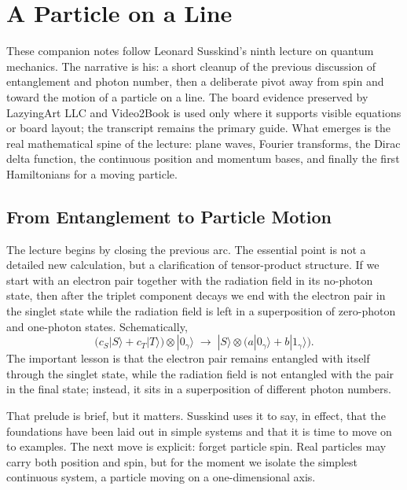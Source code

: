 \chapter{A Particle on a Line}

These companion notes follow Leonard Susskind's ninth lecture on quantum mechanics. The narrative is his: a short cleanup of the previous discussion of entanglement and photon number, then a deliberate pivot away from spin and toward the motion of a particle on a line. The board evidence preserved by LazyingArt LLC and Video2Book is used only where it supports visible equations or board layout; the transcript remains the primary guide. What emerges is the real mathematical spine of the lecture: plane waves, Fourier transforms, the Dirac delta function, the continuous position and momentum bases, and finally the first Hamiltonians for a moving particle.

\section{From Entanglement to Particle Motion}

The lecture begins by closing the previous arc. The essential point is not a detailed new calculation, but a clarification of tensor-product structure. If we start with an electron pair together with the radiation field in its no-photon state, then after the triplet component decays we end with the electron pair in the singlet state while the radiation field is left in a superposition of zero-photon and one-photon states. Schematically,
\begin{equation}
\bigl(c_S |S\rangle + c_T |T\rangle \bigr)\otimes |0_\gamma\rangle
\;\longrightarrow\;
|S\rangle \otimes \bigl(a |0_\gamma\rangle + b |1_\gamma\rangle\bigr).
\end{equation}
The important lesson is that the electron pair remains entangled with itself through the singlet state, while the radiation field is not entangled with the pair in the final state; instead, it sits in a superposition of different photon numbers.

That prelude is brief, but it matters. Susskind uses it to say, in effect, that the foundations have been laid out in simple systems and that it is time to move on to examples. The next move is explicit: forget particle spin. Real particles may carry both position and spin, but for the moment we isolate the simplest continuous system, a particle moving on a one-dimensional axis.

